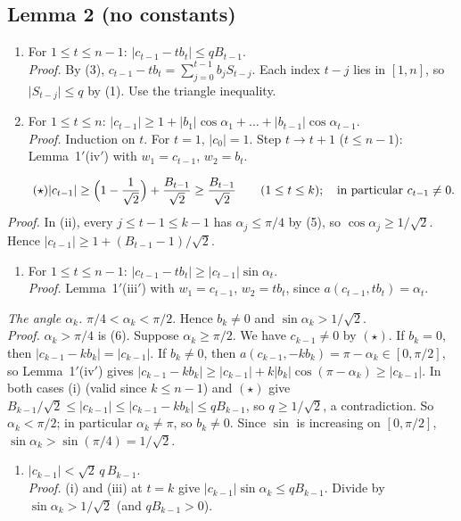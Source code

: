 \documentclass[11pt]{amsart}
\theoremstyle{remark}
\theoremstyle{plain}
\newcommand{\abs}[1]{\lvert #1\rvert}
\begin{document}
\subsection{Lemma 2 (no constants)}\label{app:lemma2}
\begin{enumerate}[label=(\roman*),leftmargin=*]
\item For $1\le t\le n-1$: $\abs{c_{t-1}-tb_t}\le qB_{t-1}$. \\
\emph{Proof.} By (3), $c_{t-1}-tb_t=\sum_{j=0}^{t-1}b_jS_{t-j}$. Each index $t-j$ lies in $[1,n]$, so $\abs{S_{t-j}}\le q$ by (1). Use the triangle inequality.
\item For $1\le t\le n$: $\abs{c_{t-1}}\ge1+\abs{b_1}\cos\alpha_1+\dots+\abs{b_{t-1}}\cos\alpha_{t-1}$. \\
\emph{Proof.} Induction on $t$. For $t=1$, $\abs{c_0}=1$. Step $t\to t+1$ ($t\le n-1$): Lemma~1$'$(iv$'$) with $w_1=c_{t-1}$, $w_2=b_t$.
\end{enumerate}
\begin{equation}\tag{$\star$}
\abs{c_{t-1}}\ge\Bigl(1-\frac1{\sqrt2}\Bigr)+\frac{B_{t-1}}{\sqrt2}\ge\frac{B_{t-1}}{\sqrt2}\qquad(1\le t\le k);\quad\text{in particular } c_{t-1}\ne0.
\end{equation}
\emph{Proof.} In (ii), every $j\le t-1\le k-1$ has $\alpha_j\le\pi/4$ by (5), so $\cos\alpha_j\ge1/\sqrt2$. Hence $\abs{c_{t-1}}\ge1+(B_{t-1}-1)/\sqrt2$.
\begin{enumerate}[label=(\roman*),start=3,leftmargin=*]
\item For $1\le t\le n-1$: $\abs{c_{t-1}-tb_t}\ge\abs{c_{t-1}}\sin\alpha_t$. \\
\emph{Proof.} Lemma~1$'$(iii$'$) with $w_1=c_{t-1}$, $w_2=tb_t$, since $a(c_{t-1},tb_t)=\alpha_t$.
\end{enumerate}
\emph{The angle $\alpha_k$.} $\pi/4<\alpha_k<\pi/2$. Hence $b_k\ne0$ and $\sin\alpha_k>1/\sqrt2$. \\
\emph{Proof.} $\alpha_k>\pi/4$ is (6). Suppose $\alpha_k\ge\pi/2$. We have $c_{k-1}\ne0$ by $(\star)$. If $b_k=0$, then $\abs{c_{k-1}-kb_k}=\abs{c_{k-1}}$. If $b_k\ne0$, then $a(c_{k-1},-kb_k)=\pi-\alpha_k\in[0,\pi/2]$, so Lemma~1$'$(iv$'$) gives $\abs{c_{k-1}-kb_k}\ge\abs{c_{k-1}}+k\abs{b_k}\cos(\pi-\alpha_k)\ge\abs{c_{k-1}}$. In both cases (i) (valid since $k\le n-1$) and $(\star)$ give $B_{k-1}/\sqrt2\le\abs{c_{k-1}}\le\abs{c_{k-1}-kb_k}\le qB_{k-1}$, so $q\ge1/\sqrt2$, a contradiction. So $\alpha_k<\pi/2$; in particular $\alpha_k\ne\pi$, so $b_k\ne0$. Since $\sin$ is increasing on $[0,\pi/2]$, $\sin\alpha_k>\sin(\pi/4)=1/\sqrt2$.
\begin{enumerate}[label=(\roman*),start=4,leftmargin=*]
\item $\abs{c_{k-1}}<\sqrt2\,q\,B_{k-1}$. \\
\emph{Proof.} (i) and (iii) at $t=k$ give $\abs{c_{k-1}}\sin\alpha_k\le qB_{k-1}$. Divide by $\sin\alpha_k>1/\sqrt2$ (and $qB_{k-1}>0$).
\end{enumerate}
\end{document}
